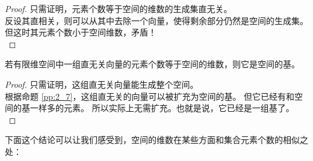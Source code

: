 \documentclass[12pt,UTF8,fontset=none]{ctexbook}
\begin{document}
\begin{proof} %
    只需证明，元素个数等于空间的维数的生成集直无关。\\
    反设其直相关，则可以从其中去除一个向量，使得剩余部分仍然是空间的生成集。
    但这时其元素个数小于空间维数，矛盾！\\
\end{proof}


\begin{pp}\label{pp:2_12}
    若有限维空间中一组直无关向量的元素个数等于空间的维数，则它是空间的基。
\end{pp}

\begin{proof} %
    只需证明，这组直无关向量能生成整个空间。\\
    根据命题 \ref{pp:2_7}，这组直无关的向量可以被扩充为空间的基。
    但它已经有和空间的基一样多的元素。
    所以实际上无需扩充。也就是说，它已经是一组基了。\\    
\end{proof}


下面这个结论可以让我们感受到，空间的维数在某些方面和集合元素个数的相似之处：
\end{document}

